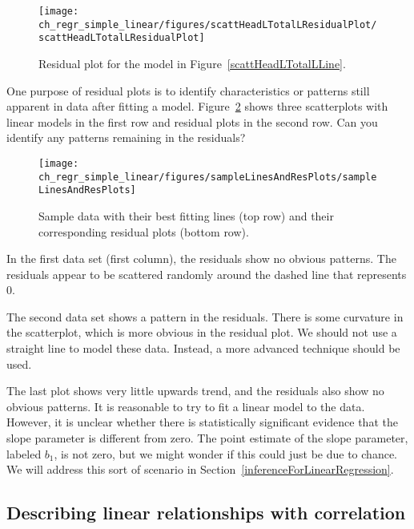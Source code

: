 \begin{figure}
   \centering
   \texttt{[image: ch\_regr\_simple\_linear/figures/scattHeadLTotalLResidualPlot/scattHeadLTotalLResidualPlot]}
   \caption{Residual plot for the model in Figure~\ref{scattHeadLTotalLLine}.}
   \label{scattHeadLTotalLResidualPlot}
\end{figure}

\begin{example}{One purpose of residual plots is to identify characteristics or patterns still apparent in data after fitting a model. Figure~\ref{sampleLinesAndResPlots} shows three scatterplots with linear models in the first row and residual plots in the second row. Can you identify any patterns remaining in the residuals?}

\begin{figure}
   \centering
   \texttt{[image: ch\_regr\_simple\_linear/figures/sampleLinesAndResPlots/sampleLinesAndResPlots]}
   \caption{Sample data with their best fitting lines (top row) and their corresponding residual plots (bottom row).}
   \label{sampleLinesAndResPlots}
\end{figure}
In the first data set (first column), the residuals show no obvious patterns. The residuals appear to be scattered randomly around the dashed line that represents 0.

The second data set shows a pattern in the residuals. There is some curvature in the scatterplot, which is more obvious in the residual plot. We should not use a straight line to model these data. Instead, a more advanced technique should be used.

The last plot shows very little upwards trend, and the residuals also show no obvious patterns. It is reasonable to try to fit a linear model to the data. However, it is unclear whether there is statistically significant evidence that the slope parameter is different from zero. The point estimate of the slope parameter, labeled $b_1$, is not zero, but we might wonder if this could just be due to chance. We will address this sort of scenario in Section~\ref{inferenceForLinearRegression}.
\end{example}


\subsection{Describing linear relationships with correlation}


